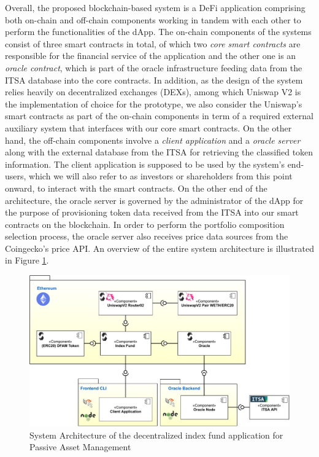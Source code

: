 Overall, the proposed blockchain-based system is a DeFi application comprising both on-chain and off-chain components working in tandem with each other to perform the functionalities of the dApp. The on-chain components of the systems consist of three smart contracts in total, of which two \textit{core smart contracts} are responsible for the financial service of the application and the other one is an \textit{oracle contract}, which is part of the oracle infrastructure feeding data from the ITSA database into the core contracts. In addition, as the design of the system relies heavily on decentralized exchanges (DEXs), among which Uniswap V2 is the implementation of choice for the prototype, we also consider the Uniswap's smart contracts as part of the on-chain components in term of a required external auxiliary system that interfaces with our core smart contracts. On the other hand, the off-chain components involve a \textit{client application} and a \textit{oracle server} along with the external database from the ITSA for retrieving the classified token information. The client application is supposed to be used by the system's end-users, which we will also refer to as investors or shareholders from this point onward, to interact with the smart contracts. On the other end of the architecture, the oracle server is governed by the administrator of the dApp for the purpose of provisioning token data received from the ITSA into our smart contracts on the blockchain. In order to perform the portfolio composition selection process, the oracle server also receives price data sources from the Coingecko's price API. An overview of the entire system architecture is illustrated in Figure \ref{fig:sys_architecture}. 



\begin{figure}
    \centering
  \includegraphics[width=\linewidth]{figures/system-architecture.pdf}
  \caption{System Architecture of the decentralized index fund application for Passive Asset Management}
  \label{fig:sys_architecture}
\end{figure}

